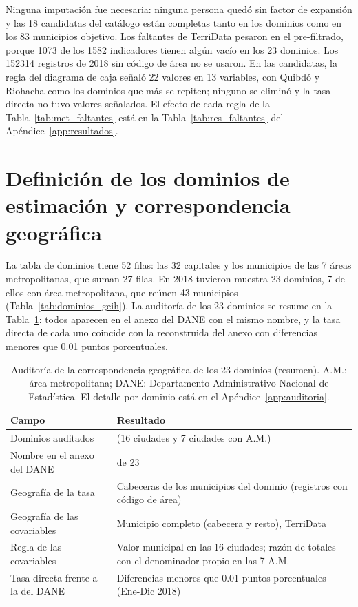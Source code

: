 Ninguna imputación fue necesaria: ninguna persona quedó sin factor de expansión y las 18 candidatas del catálogo están completas tanto en los dominios como en los 83 municipios objetivo. Los faltantes de TerriData pesaron en el pre-filtrado, porque \num{1073} de los \num{1582} indicadores tienen algún vacío en los 23 dominios. Los \num{152314} registros de 2018 sin código de área no se usaron. En las candidatas, la regla del diagrama de caja señaló 22 valores en 13 variables, con Quibdó y Riohacha como los dominios que más se repiten; ninguno se eliminó y la tasa directa no tuvo valores señalados. El efecto de cada regla de la Tabla~\ref{tab:met_faltantes} está en la Tabla~\ref{tab:res_faltantes} del Apéndice~\ref{app:resultados}.

\section{Definición de los dominios de estimación y correspondencia geográfica}
\label{sec:res_dominios}

La tabla de dominios tiene 52 filas: las 32 capitales y los municipios de las 7 áreas metropolitanas, que suman 27 filas. En 2018 tuvieron muestra 23 dominios, 7 de ellos con área metropolitana, que reúnen 43 municipios (Tabla~\ref{tab:dominios_geih}). La auditoría de los 23 dominios se resume en la Tabla~\ref{tab:res_auditoria}: todos aparecen en el anexo del DANE con el mismo nombre, y la tasa directa de cada uno coincide con la reconstruida del anexo con diferencias menores que 0.01 puntos porcentuales.

\begin{table}[!htbp]
\centering
\small
\caption{Auditoría de la correspondencia geográfica de los 23 dominios (resumen). A.M.: área metropolitana; DANE: Departamento Administrativo Nacional de Estadística. El detalle por dominio está en el Apéndice~\ref{app:auditoria}.}
\label{tab:res_auditoria}
\begin{tabularx}{\linewidth}{>{\raggedright\arraybackslash}p{4.2cm} >{\raggedright\arraybackslash}X}
\toprule
Campo & Resultado \\
\midrule
Dominios auditados & 23 (16 ciudades y 7 ciudades con A.M.) \\
Nombre en el anexo del DANE & 23 de 23 \\
Geografía de la tasa & Cabeceras de los municipios del dominio (registros con código de área) \\
Geografía de las covariables & Municipio completo (cabecera y resto), TerriData \\
Regla de las covariables & Valor municipal en las 16 ciudades; razón de totales con el denominador propio en las 7 A.M. \\
Tasa directa frente a la del DANE & Diferencias menores que 0.01 puntos porcentuales (Ene-Dic 2018) \\
\bottomrule
\end{tabularx}
\end{table}

